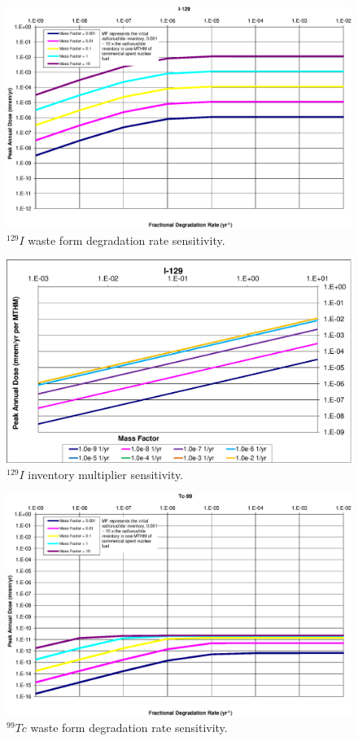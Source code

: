 \begin{figure}[ht!]
  \centering
  \includegraphics[width=\linewidth]{129IDegRate.eps}
  \caption{$^{129}I$ waste form degradation rate sensitivity.}
  \label{fig:WFDegI129}
\end{figure}

\begin{figure}[ht!]
  \centering
  \includegraphics[width=\linewidth]{129IMF.eps}
  \caption{$^{129}I$ inventory multiplier sensitivity.}
  \label{fig:WFDegI129MF}
\end{figure}



\begin{figure}[ht!]
  \centering
  \includegraphics[width=\linewidth]{99TcDegRate.eps}
  \caption{$^{99}Tc$ waste form degradation rate sensitivity.}
  \label{fig:WFDegTc99}
\end{figure}

